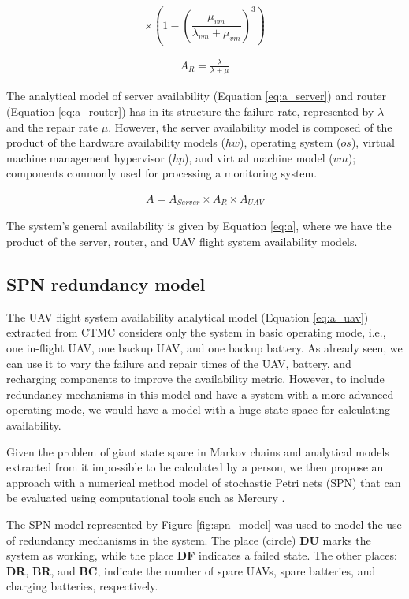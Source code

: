 \documentclass[conference]{IEEEtran}
\begin{document}
\[\times(1- (\frac{\mu_{vm}}{\lambda_{vm} + \mu_{vm}})^{3})\]

\begin{align}
\label{eq:a_router}
A_{R} = \frac{\lambda}{\lambda + \mu} 
\end{align}

The analytical model of server availability (Equation \ref{eq:a_server}) and router (Equation \ref{eq:a_router}) has in its structure the failure rate, represented by $\lambda$ and the repair rate $\mu $. However, the server availability model is composed of the product of the hardware availability models ($hw$), operating system ($os$), virtual machine management hypervisor ($hp$), and virtual machine model ($vm$); components commonly used for processing a monitoring system.

\begin{align}\label{eq:a}
A = A_{Server} \times A_{R}  \times A_{UAV}
\end{align}

The system's general availability is given by Equation \ref{eq:a}, where we have the product of the server, router, and UAV flight system availability models.

\subsection{SPN redundancy model}

The UAV flight system availability analytical model (Equation \ref{eq:a_uav}) extracted from CTMC considers only the system in basic operating mode, i.e., one in-flight UAV, one backup UAV, and one backup battery. As already seen, we can use it to vary the failure and repair times of the UAV, battery, and recharging components to improve the availability metric. However, to include redundancy mechanisms in this model and have a system with a more advanced operating mode, we would have a model with a huge state space for calculating availability.

Given the problem of giant state space in Markov chains and analytical models extracted from it impossible to be calculated by a person, we then propose an approach with a numerical method model of stochastic Petri nets (SPN) that can be evaluated using computational tools such as Mercury \cite{maciel2017mercury}.

The SPN model represented by Figure \ref{fig:spn_model} was used to model the use of redundancy mechanisms in the system. The place (circle) \textbf{DU} marks the system as working, while the place \textbf{DF} indicates a failed state. The other places: \textbf{DR}, \textbf{BR}, and \textbf{BC}, indicate the number of spare UAVs, spare batteries, and charging batteries, respectively.
\end{document}
